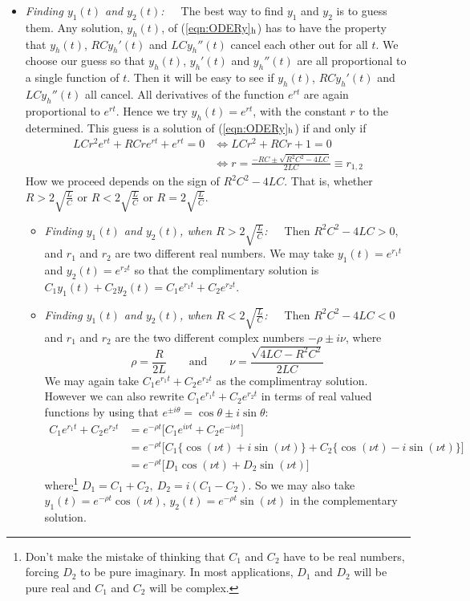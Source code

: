 \begin{eg}
\medskip
\begin{itemize}
\item
\emph{Finding $y_1(t)$ and $y_2(t)$:}\ \ \ 
The best way to find $y_1$ and $y_2$ is to guess them. 
Any solution, $y_h(t)$, of 
(\ref{eqn:ODERy}$_{\rm h}$) has to have the property that $y_h(t)$, $RCy_h'(t)$ and 
$LCy_h''(t)$ cancel each other out for all $t$. We choose our guess 
so that $y_h(t)$, $y_h'(t)$ and $y_h''(t)$ are all proportional to a single 
function of $t$. Then it will be easy to see if $y_h(t)$, $RCy_h'(t)$ and 
$LCy_h''(t)$ all cancel. All derivatives of the function $e^{rt}$ are again proportional to $e^{rt}$. Hence we try $y_h(t)=e^{rt}$, with the constant
$r$ to the determined. This guess is a solution of (\ref{eqn:ODERy}$_{\rm h}$) 
if and only if
\begin{equation}\label{eqn:ODERroots}
\begin{split}
LCr^2e^{rt}+RCre^{rt}+e^{rt}=0
&\iff LCr^2+RCr+1 =0 \\
&\iff  r=\frac{-RC\pm\sqrt{R^2C^2-4LC}}{2LC}\equiv r_{1,2}
\end{split}
\end{equation}
How we proceed depends on the sign of $R^2C^2-4LC$. That is, whether
$R> 2\sqrt{\frac{L}{C}}$ or  $R< 2\sqrt{\frac{L}{C}}$
or $R = 2\sqrt{\frac{L}{C}}$.
\begin{itemize}
\item 
\emph{Finding $y_1(t)$ and $y_2(t)$, when $R> 2\sqrt{\frac{L}{C}}$:}\ \ \ 
Then $R^2C^2-4LC> 0$, and $r_1$ and $r_2$ are two different real numbers. 
We may take $y_1(t)=e^{r_1t}$ and $y_2(t)=e^{r_2t}$ so that 
the complimentary solution is 
$
C_1y_1(t)+C_2y_2(t)=C_1 e^{r_1t}+C_2e^{r_2 t}
$. 
\smallskip%
\item 
\emph{Finding $y_1(t)$ and $y_2(t)$, when $R< 2\sqrt{\frac{L}{C}}$:}\ \ \ 
Then $R^2C^2-4LC< 0$ and $r_1$ and $r_2$
are the two different complex numbers $-\rho\pm i\nu$, where 
\begin{equation*}
\rho=\frac{R}{2L}\qquad\text{and}\qquad
 \nu=\frac{\sqrt{4LC-R^2C^2}}{2LC}
\end{equation*} 
We may again take 
$
C_1 e^{r_1t}+C_2e^{r_2 t}
$
as the complimentray solution.  However we can also rewrite
$C_1 e^{r_1t}+C_2e^{r_2 t}$ in terms of real valued functions 
by using that $e^{\pm i\theta}=\cos\theta\pm i\sin\theta$:
\begin{align*}
C_1 e^{r_1t}+C_2e^{r_2 t} 
  &=e^{-\rho t}\big[C_1e^{i\nu t}+C_2e^{-i\nu t}\big]\\
  &=e^{-\rho t}\big[C_1\big\{\cos(\nu t)+i\sin(\nu t)\big\}+
               C_2\big\{\cos(\nu t)-i\sin(\nu t)\big\}\big]\\
  &=e^{-\rho t}\big[D_1\cos(\nu t)+D_2\sin(\nu t)\big]
\end{align*}
where\footnote{Don't make the mistake of thinking that $C_1$ 
and $C_2$ have to be real numbers, forcing $D_2$ to be pure  imaginary. 
In most applications, $D_1$ and $D_2$ will be pure real and $C_1$ and 
$C_2$ will be complex.} $D_1=C_1+C_2,\ D_2=i(C_1-C_2)$. So we may also take 
$y_1(t)=e^{-\rho t}\cos(\nu t)$, $y_2(t)=e^{-\rho t}\sin(\nu t)$ in 
the complementary solution. 


\end{itemize}
\end{itemize}
\end{eg}
